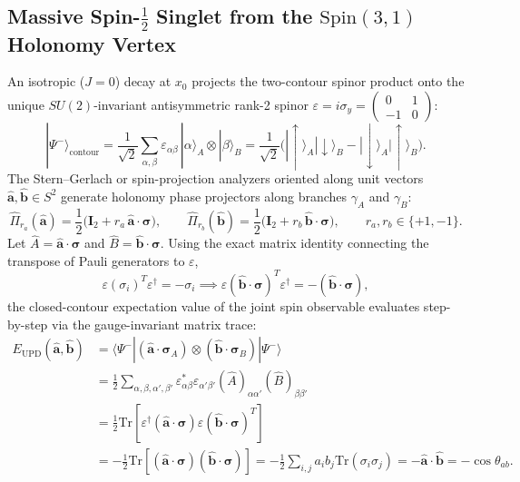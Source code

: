 \documentclass[11pt,a4paper]{article}
\begin{document}
\subsection{Massive Spin-$\frac{1}{2}$ Singlet from the $\mathrm{Spin}(3,1)$ Holonomy Vertex}
An isotropic ($J=0$) decay at $x_0$ projects the two-contour spinor product onto the unique $SU(2)$-invariant antisymmetric rank-2 spinor $\varepsilon = i\sigma_y = \begin{pmatrix}0 & 1 \\ -1 & 0\end{pmatrix}$:
\begin{equation}
|\Psi^-\rangle_{\mathrm{contour}} = \frac{1}{\sqrt{2}} \sum_{\alpha,\beta} \varepsilon_{\alpha\beta}\, |\alpha\rangle_A \otimes |\beta\rangle_B = \frac{1}{\sqrt{2}}\big(|\uparrow\rangle_A |\downarrow\rangle_B - |\downarrow\rangle_A |\uparrow\rangle_B\big).
\end{equation}
The Stern--Gerlach or spin-projection analyzers oriented along unit vectors $\hat{\mathbf{a}}, \hat{\mathbf{b}} \in S^2$ generate holonomy phase projectors along branches $\gamma_A$ and $\gamma_B$:
\begin{equation}
\hat{\Pi}_{r_a}(\hat{\mathbf{a}}) = \frac{1}{2}\big(\mathbf{I}_2 + r_a \, \hat{\mathbf{a}}\cdot\boldsymbol{\sigma}\big), \qquad \hat{\Pi}_{r_b}(\hat{\mathbf{b}}) = \frac{1}{2}\big(\mathbf{I}_2 + r_b \, \hat{\mathbf{b}}\cdot\boldsymbol{\sigma}\big), \qquad r_a, r_b \in \{+1, -1\}.
\end{equation}
Let $\hat{A} = \hat{\mathbf{a}}\cdot\boldsymbol{\sigma}$ and $\hat{B} = \hat{\mathbf{b}}\cdot\boldsymbol{\sigma}$. Using the exact matrix identity connecting the transpose of Pauli generators to $\varepsilon$,
\begin{equation}
\varepsilon (\sigma_i)^T \varepsilon^\dagger = -\sigma_i \implies \varepsilon (\hat{\mathbf{b}}\cdot\boldsymbol{\sigma})^T \varepsilon^\dagger = -(\hat{\mathbf{b}}\cdot\boldsymbol{\sigma}),
\label{eq:pauli_eps}
\end{equation}
the closed-contour expectation value of the joint spin observable evaluates step-by-step via the gauge-invariant matrix trace:
\begin{align}
E_{\mathrm{UPD}}(\hat{\mathbf{a}}, \hat{\mathbf{b}}) &= \langle \Psi^- | (\hat{\mathbf{a}}\cdot\boldsymbol{\sigma}_A) \otimes (\hat{\mathbf{b}}\cdot\boldsymbol{\sigma}_B) | \Psi^- \rangle \nonumber \\
&= \frac{1}{2} \sum_{\alpha,\beta,\alpha',\beta'} \varepsilon_{\alpha\beta}^* \varepsilon_{\alpha'\beta'} (\hat{A})_{\alpha\alpha'} (\hat{B})_{\beta\beta'} \nonumber \\
&= \frac{1}{2} \mathrm{Tr}\!\left[ \varepsilon^\dagger (\hat{\mathbf{a}}\cdot\boldsymbol{\sigma}) \varepsilon (\hat{\mathbf{b}}\cdot\boldsymbol{\sigma})^T \right] \nonumber \\
&= -\frac{1}{2} \mathrm{Tr}\!\left[ (\hat{\mathbf{a}}\cdot\boldsymbol{\sigma}) (\hat{\mathbf{b}}\cdot\boldsymbol{\sigma}) \right] = -\frac{1}{2}\sum_{i,j} a_i b_j \mathrm{Tr}(\sigma_i \sigma_j) = -\hat{\mathbf{a}}\cdot\hat{\mathbf{b}} = -\cos\theta_{ab}.
\label{eq:singlet_correlator}
\end{align}
\end{document}
